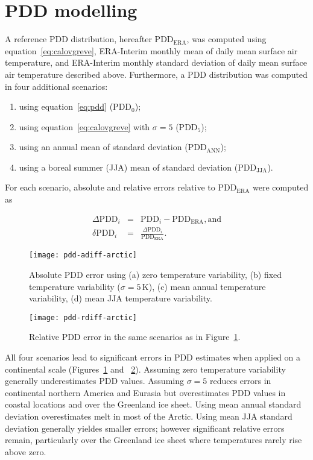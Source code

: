 \documentclass[review]{igs}
\begin{document}

\section{PDD modelling}

A reference PDD distribution, hereafter $\mathrm{PDD_{ERA}}$, was computed using equation~\ref{eq:calovgreve}, ERA-Interim monthly mean of daily mean surface air temperature, and ERA-Interim monthly standard deviation of daily mean surface air temperature described above. Furthermore, a PDD distribution was computed in four additional scenarios:

\begin{enumerate}
  \item using equation~\ref{eq:pdd} ($\mathrm{PDD_{0}}$);
  \item using equation~\ref{eq:calovgreve} with $\sigma=5$ ($\mathrm{PDD_{5}}$);
  \item using an annual mean of standard deviation ($\mathrm{PDD_{ANN}}$);
  \item using a boreal summer (JJA) mean of standard deviation ($\mathrm{PDD_{JJA}}$).
\end{enumerate}

For each scenario, absolute and relative errors relative to $\mathrm{PDD_{ERA}}$ were computed as

\begin{eqnarray}
  \Delta\mathrm{PDD}_i &=& \mathrm{PDD}_i - \mathrm{PDD_{ERA}}, \mathrm{and}\\
  \delta\mathrm{PDD}_i &=& \frac{\Delta\mathrm{PDD}_i}{\mathrm{PDD_{ERA}}}.
\end{eqnarray}

\begin{figure}
  \centering\texttt{[image: pdd-adiff-arctic]}
  \caption{Absolute PDD error using (a) zero temperature variability, (b) fixed temperature variability ($\sigma=5\,\mathrm{K}$), (c) mean annual temperature variability, (d) mean JJA temperature variability.}
  \label{fig:adiff}
\end{figure}

\begin{figure}
  \centering\texttt{[image: pdd-rdiff-arctic]}
  \caption{Relative PDD error in the same scenarios as in Figure~\ref{fig:adiff}.}
  \label{fig:rdiff}
\end{figure}

All four scenarios lead to significant errors in PDD estimates when applied on a continental scale (Figures~\ref{fig:adiff} and ~\ref{fig:rdiff}). Assuming zero temperature variability generally underestimates PDD values. Assuming $\sigma=5$ reduces errors in continental northern America and Eurasia but overestimates PDD values in coastal locations and over the Greenland ice sheet. Using mean annual standard deviation overestimates melt in most of the Arctic. Using mean JJA standard deviation generally yieldes smaller errors; however significant relative errors remain, particularly over the Greenland ice sheet where temperatures rarely rise above zero.
\end{document}
